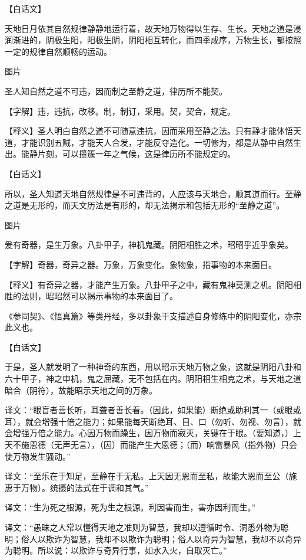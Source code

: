 \documentclass[12pt,UTF8]{ctexbook}
\begin{document}
【白话文】


天地日月依其自然规律静静地运行着，故天地万物得以生存、生长。天地之道是浸润渐进的，阴极生阳，阳极生阴，阴阳相互转化，而四季成序，万物生长，都按照一定的规律自然顺畅的运动。

图片​


圣人知自然之道不可违，因而制之至静之道，律历所不能契。


【字解】违，违抗，改移。制，制订，采用。契，契合，规定。


【释义】圣人明白自然之道不可随意违抗，因而采用至静之法。只有静才能体悟天道，才能识别五贼，才能天人合发，才能反夺造化。一切修为，都是从静中自然生出。能静片刻，可以攒簇一年之气候，这是律历所不能规定的。


【白话文】


所以，圣人知道天地自然规律是不可违背的，人应该与天地合，顺其道而行。至静之道是无形的，而天文历法是有形的，却无法揭示和包括无形的“至静之道”。


图片​


爰有奇器，是生万象。八卦甲子，神机鬼藏。阴阳相胜之术，昭昭乎近乎象矣。


【字解】奇器，奇异之器。万象，万象变化。象物象，指事物的本来面目。



【释义】有奇异之器，才能产生万象。八卦甲子之中，藏有鬼神莫测之机。阴阳相胜的法则，昭昭然可以揭示事物的本来面目了。


《参同契》、《悟真篇》等类丹经，多以卦象干支描述自身修练中的阴阳变化，亦宗此义也。


【白话文】


于是，圣人就发明了一种神奇的东西，用以昭示天地万物之象，这就是阴阳八卦和六十甲子，神之申机，鬼之屈藏，无不包括在内。阴阳相生相克之术，与天地之道暗合（阴符），故能昭示天地之间的万象。


译文：“眼盲者善长听，耳聋者善长看。（因此，如果能）断绝或助利其一（或眼或耳），就会增强十倍之能力；如果能每天断绝耳、目、口（勿听、勿视、勿言），就会增强万倍之能力。心因万物而躁生，因万物而寂灭，关键在于眼。（要知道，）上天不施恩德（无声无言），（因）而能产生大恩德；（而）响雷暴风（指外物）只会使万物发生骚动。”

译文：“至乐在于知足，至静在于无私。上天因无恩而至私，故能大恩而至公（施惠于万物）。统摄的法式在于调和其气。”

译文：“生为死之根源，死为生之根源。利因害而生，害亦因利而生。”

译文：“愚昧之人常以懂得天地之准则为智慧，我却以遵循时令、洞悉外物为聪明；俗人以欺诈为智慧，我却不以欺诈为聪明；俗人以奇异为智慧，我却不以奇异为聪明。所以说：以欺诈与奇异行事，如水入火，自取灭亡。”
\end{document}
